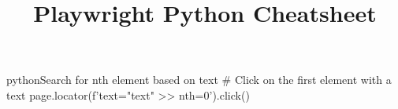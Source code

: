 \documentclass[10pt,a4paper]{article}
\title{\color{w3schools}Playwright Python Cheatsheet
}
\begin{document}
\maketitle
\small
\begin{multicols}{3}

\thispagestyle{empty}
\scriptsize

% 




\begin{codebox}{python}{Search for nth element based on text}
# Click on the first element with a text
page.locator(f'text="{text}" >> nth=0').click()

\end{codebox}


\AtNextBibliography{\footnotesize}
\printbibliography  
\end{multicols}
\end{document}
